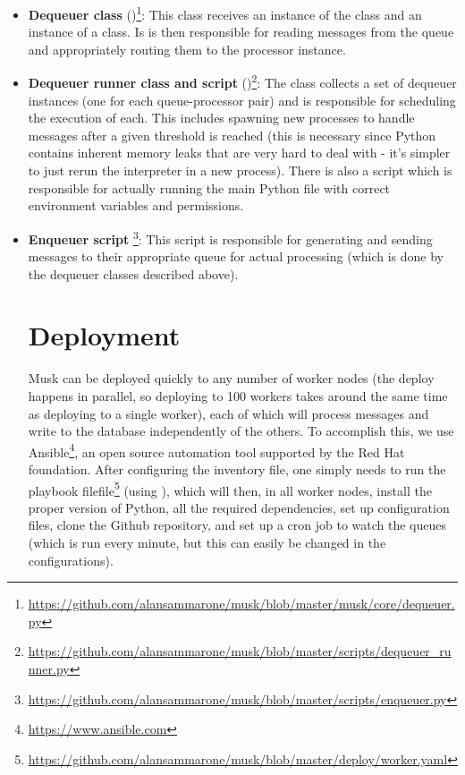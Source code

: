 \begin{itemize}
    \raggedright\item \textbf{Dequeuer class} ()\footnote{\url{https://github.com/alansammarone/musk/blob/master/musk/core/dequeuer.py}}: This class receives an instance of the  class and an instance of a  class. Is is then responsible for reading messages from the queue and appropriately routing them to the processor instance. 
    
    
    \raggedright\item\textbf{Dequeuer runner class and script} ()\footnote{\url{https://github.com/alansammarone/musk/blob/master/scripts/dequeuer_runner.py}}: The  class collects a set of dequeuer instances (one for each queue-processor pair) and is responsible for scheduling the execution of each. This includes spawning  new processes to handle messages after a given threshold is reached (this is necessary since Python contains inherent memory leaks that are very hard to deal with - it's simpler to just rerun the interpreter in a new process). There is also a  script which is responsible for actually running the main Python file with correct environment variables and permissions.
    
    \raggedright\item \textbf{Enqueuer script} \footnote{\url{https://github.com/alansammarone/musk/blob/master/scripts/enqueuer.py}}: This script is responsible for generating and sending messages to their appropriate queue for actual processing (which is done by the dequeuer classes described above).
    
    
\section{Deployment}

Musk can be deployed quickly to any number of worker nodes (the deploy happens in parallel, so deploying to 100 workers takes around the same time as deploying to a single worker), each of which will process messages and write to the database independently of the others. To accomplish this, we use Ansible\footnote{\url{https://www.ansible.com}}, an open source automation tool supported by the Red Hat foundation. After configuring the inventory file, one simply needs to run the playbook filefile\footnote{\url{https://github.com/alansammarone/musk/blob/master/deploy/worker.yaml}} (using ), which will then, in all worker nodes, install the proper version of Python, all the required dependencies, set up configuration files, clone the Github repository, and set up a cron job to watch the queues (which is run every minute, but this can easily be changed in the configurations).

\end{itemize}



